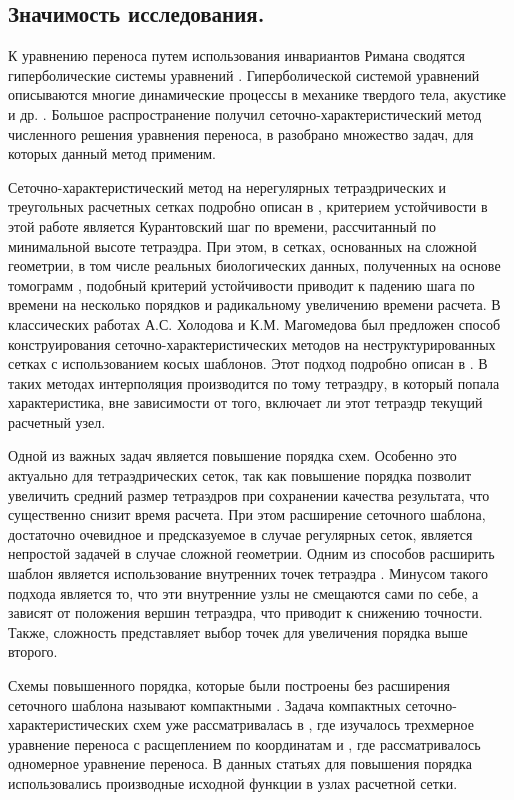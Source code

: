 \documentclass[14pt]{article}
\begin{document}
\subsection*{Значимость исследования.}
К уравнению переноса путем использования инвариантов Римана сводятся гиперболические системы уравнений \cite{1}. 
Гиперболической системой уравнений описываются многие динамические процессы в механике твердого тела, акустике и др. \cite{2}.  
Большое распространение получил сеточно-характеристический метод численного решения уравнения переноса, в \cite{3} разобрано множество задач, для которых данный метод применим. 

Сеточно-характеристический метод на нерегулярных тетраэдрических и треугольных расчетных сетках подробно описан в \cite{4}, критерием устойчивости в этой работе является Курантовский шаг по времени, рассчитанный по минимальной высоте тетраэдра.
При этом, в сетках, основанных на сложной геометрии, в том числе реальных биологических данных, полученных на основе томограмм \cite{5}, подобный критерий устойчивости приводит к падению шага по времени на несколько порядков и радикальному увеличению времени расчета.
В классических работах А.С. Холодова и К.М. Магомедова был предложен способ конструирования сеточно-характеристических методов на неструктурированных сетках с использованием косых шаблонов.
Этот подход подробно описан в \cite{6}.
В таких методах интерполяция производится по тому тетраэдру, в который попала характеристика, вне зависимости от того, включает ли этот тетраэдр текущий расчетный узел.

Одной из важных задач является повышение порядка схем. 
Особенно это актуально для тетраэдрических сеток, так как повышение порядка позволит увеличить средний размер тетраэдров при сохранении качества результата, что существенно снизит время расчета.
При этом расширение сеточного шаблона, достаточно очевидное и предсказуемое в случае регулярных сеток, является непростой задачей в случае сложной геометрии. 
Одним из способов расширить шаблон является использование внутренних точек тетраэдра \cite{7}.
Минусом такого подхода является то, что эти внутренние узлы не смещаются сами по себе, а зависят от положения вершин тетраэдра, что приводит к снижению точности.
Также, сложность представляет выбор точек для увеличения порядка выше второго.

Схемы повышенного порядка, которые были построены без расширения сеточного шаблона называют компактными \cite{8}. 
Задача  компактных сеточно-характеристических схем уже рассматривалась в \cite{9}, где изучалось трехмерное уравнение переноса с расщеплением по координатам и \cite{10}, где рассматривалось одномерное уравнение переноса. 
В данных статьях для повышения порядка использовались производные исходной функции в узлах расчетной сетки. 
\end{document}
